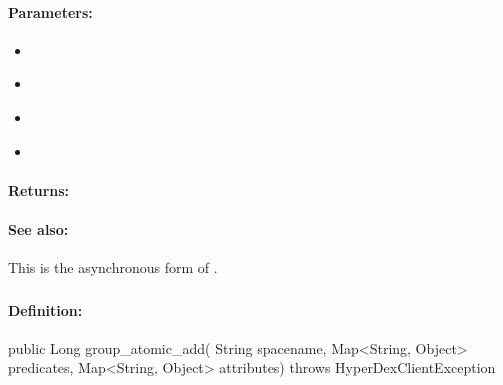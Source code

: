 \paragraph{Parameters:}
\begin{itemize}[noitemsep]
\item {}\\

\item {}\\

\item {}\\

\item {}\\

\end{itemize}

\paragraph{Returns:}


\paragraph{See also:}  This is the asynchronous form of .

\pagebreak
\subsubsection{}
\label{api:java:group_atomic_add}


\paragraph{Definition:}
\begin{javacode}
public Long group_atomic_add(
        String spacename,
        Map<String, Object> predicates,
        Map<String, Object> attributes) throws HyperDexClientException
\end{javacode}

